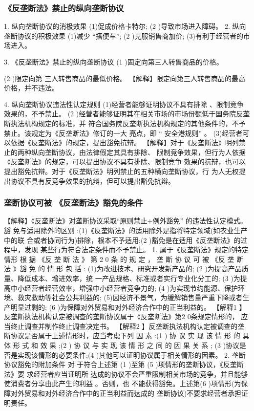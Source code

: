 \documentclass[UTF8,12pt]{ctexart}
\numberwithin{equation}{section} %
\numberwithin{figure}{section}
\numberwithin{table}{section}
\begin{document}
	
	\subsubsection{《反垄断法》禁止的纵向垄断协议}
	1. 纵向垄断协议的消极效果 (1)促成价格卡特尔;
	(2 )导致市场进入障碍。
	2. 纵向垄断协议的积极效果 (1)减少 “搭便车”;
	(2 )克服销售商加价; (3)有利于经营者的市场进入。
	
	
	3. 《反垄断法》禁止的纵向垄断协议
	(1 )固定向第三人转售商品的价格。
	
	(2 )限定向第 三人转售商品的最低价格。
	【解释】限定向第三人转售商品的最高价格，并不违法。
	
	4. 纵向垄断协议违法性认定规则
	(1)经营者能够证明协议不具有排除 、限制竞争效果的，不予禁止。
	(2 )经营者能够证明其在相关市场的市场份额低于国务院反垄断执法机构规定的标准，并 符合国务院反垄断执法机构规定的其他条件的，不予禁止。该规定为《反垄断法》修订的一大 亮点，即 “ 安全港规则” 。
	(3)经营者可以依据《反垄断法》的规定，提出豁免抗辩。
	【解释】对于《反垄断法》明列禁止的两种纵向垄断协议，由法律假定其具有排除、 限制竞争效果，但行为人依据《反垄断法》的规定，可以提出协议不具有排除、限制竞争 效果的抗辩，也可以提出豁免抗辩。对于《反垄断法》明列禁止的五种横向垄断协议，行 为人无权提出协议不具有反竞争效果的抗辩，但可以提出豁免抗辩。
	
	\subsubsection{垄断协议可被 《反垄断法》豁免的条件}
	
	【解释】《反垄断法》对垄断协议采取“原则禁止+例外豁免” 的违法性认定模式。豁 免与适用除外的区别 :(1)《反垄断法》的适用除外是指将特定领域(如农业生产中的联 合或者协同行为)排除，根本不予适用;(2 )豁免是在适用《反垄断法》的过程中，发现 某些行为符合法定条件而不予禁止。
	1. 属于《反垄断法》规定的特定情形
	根 据 《反 垄 断 法 》 第 2 0 条 的 规 定 ， 垄 断 协 议 可 被 《反 垄 断 法 》豁 免 的 情 形 包 括 : (1)为改进技术、研究开发新产品的;
	(2 )为提高产品质量、降低成本、增进效率，统 一产品规格、标准或者实行专业化分工的; (3 )为提高中小经营者经营效率，增强中小经营者竞争力的;
	(4 )为实现节约能源、保护环境、救灾救助等社会公共利益的; (5)因经济不景气，为缓解销售量严重下降或者生产明显过剩的;
	(6 )为保障对外贸易和对外经济合作中的正当利益的。
	【解释1 】反垄断执法机构认定被调查的垄断协议属于《反垄断法》第2 0条规定情形的， 应当终止调查并制作终止调查决定书。
	【解释2 】反垄断执法机构认定被调查的垄断协议是否属于上述情形时，应当考虑下列 因 素 :(1 ) 协 议 实 现 该 情 形 的 具 体 形 式 和 效 果 ;(2 ) 协 议 与 实 现 该 情 形 之 间 的 因 果 关 系 ; (3 )协议是否是实现该情形的必要条件;(4 )其他可以证明协议属于相关情形的因素。
	2. 垄断协议豁免的附加条件
	对 于符合上述第 (1 )至第 (5 )项情形的垄断协议，《反垄断法》要 求经营者应当证明所 达成的协议不会严重限制相关市场的竞争，并且能够使消费者分享由此产生的利益 。否则，也 不能获得豁免。上述第(6 )项情形(为保障对外贸易和对外经济合作中的正当利益而达成的 垄断协议)不要求经营者承担证明责任。
	
\end{document}
